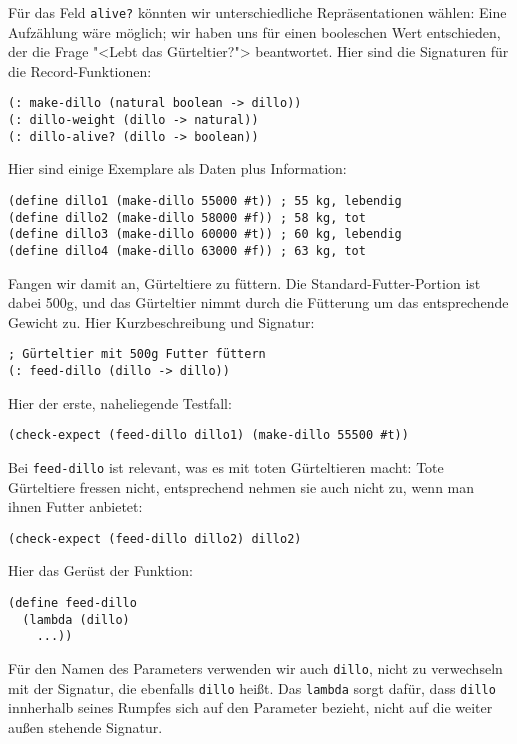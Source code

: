 Für das Feld \lstinline{alive?} könnten wir unterschiedliche Repräsentationen
wählen: Eine Aufzählung wäre möglich; wir haben uns für einen
booleschen Wert entschieden, der die Frage "<Lebt das Gürteltier?">
beantwortet.  Hier sind die Signaturen für die Record-Funktionen:
%
\begin{lstlisting}
(: make-dillo (natural boolean -> dillo))
(: dillo-weight (dillo -> natural))
(: dillo-alive? (dillo -> boolean))
\end{lstlisting}
%
Hier sind einige Exemplare als Daten plus Information:
%
\begin{lstlisting}
(define dillo1 (make-dillo 55000 #t)) ; 55 kg, lebendig 
(define dillo2 (make-dillo 58000 #f)) ; 58 kg, tot
(define dillo3 (make-dillo 60000 #t)) ; 60 kg, lebendig
(define dillo4 (make-dillo 63000 #f)) ; 63 kg, tot
\end{lstlisting}
%
Fangen wir damit an, Gürteltiere zu füttern.  Die
Standard-Futter-Portion ist dabei 500g, und das Gürteltier nimmt durch
die Fütterung um das entsprechende Gewicht zu.  Hier Kurzbeschreibung
und Signatur:
%
\begin{lstlisting}
; Gürteltier mit 500g Futter füttern
(: feed-dillo (dillo -> dillo))
\end{lstlisting}
%
Hier der erste, naheliegende Testfall:
%
\begin{lstlisting}
(check-expect (feed-dillo dillo1) (make-dillo 55500 #t))
\end{lstlisting}
%
Bei \lstinline{feed-dillo} ist relevant, was es mit toten
Gürteltieren macht: Tote Gürteltiere fressen nicht, entsprechend
nehmen sie auch nicht zu, wenn man ihnen Futter anbietet:
%
\begin{lstlisting}
(check-expect (feed-dillo dillo2) dillo2)
\end{lstlisting}
%
Hier das Gerüst der Funktion:
\begin{lstlisting}
(define feed-dillo
  (lambda (dillo)
    ...))
\end{lstlisting}
%
Für den Namen des Parameters verwenden wir auch \lstinline{dillo}, nicht
zu verwechseln mit der Signatur, die ebenfalls \lstinline{dillo} heißt. Das
\lstinline{lambda} sorgt dafür, dass \lstinline{dillo} innherhalb seines
Rumpfes sich auf den Parameter bezieht, nicht auf die weiter außen
stehende Signatur.

